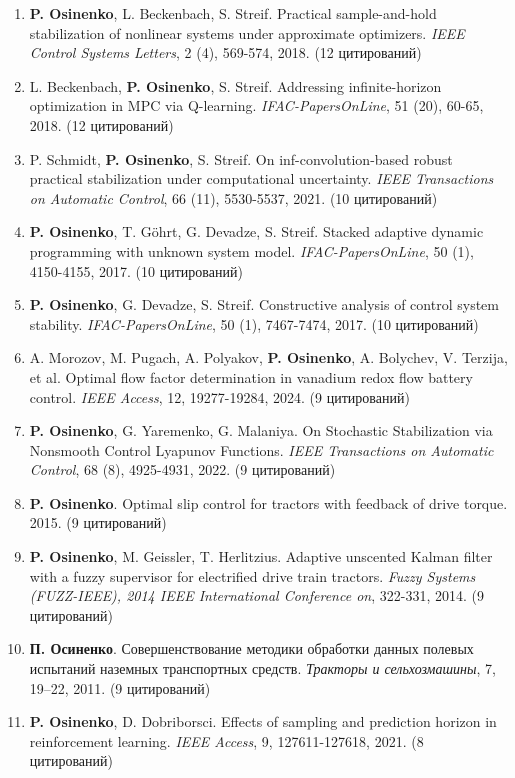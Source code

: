 \documentclass[12pt]{article}
\begin{document}
\begin{enumerate}[itemsep=5pt]
\item \textbf{P. Osinenko}, L. Beckenbach, S. Streif. Practical sample-and-hold stabilization of nonlinear systems under approximate optimizers. \textit{IEEE Control Systems Letters}, 2 (4), 569-574, 2018. (12 цитирований)

\item L. Beckenbach, \textbf{P. Osinenko}, S. Streif. Addressing infinite-horizon optimization in MPC via Q-learning. \textit{IFAC-PapersOnLine}, 51 (20), 60-65, 2018. (12 цитирований)

\item P. Schmidt, \textbf{P. Osinenko}, S. Streif. On inf-convolution-based robust practical stabilization under computational uncertainty. \textit{IEEE Transactions on Automatic Control}, 66 (11), 5530-5537, 2021. (10 цитирований)

\item \textbf{P. Osinenko}, T. Göhrt, G. Devadze, S. Streif. Stacked adaptive dynamic programming with unknown system model. \textit{IFAC-PapersOnLine}, 50 (1), 4150-4155, 2017. (10 цитирований)

\item \textbf{P. Osinenko}, G. Devadze, S. Streif. Constructive analysis of control system stability. \textit{IFAC-PapersOnLine}, 50 (1), 7467-7474, 2017. (10 цитирований)

\item A. Morozov, M. Pugach, A. Polyakov, \textbf{P. Osinenko}, A. Bolychev, V. Terzija, et al. Optimal flow factor determination in vanadium redox flow battery control. \textit{IEEE Access}, 12, 19277-19284, 2024. (9 цитирований)

\item \textbf{P. Osinenko}, G. Yaremenko, G. Malaniya. On Stochastic Stabilization via Nonsmooth Control Lyapunov Functions. \textit{IEEE Transactions on Automatic Control}, 68 (8), 4925-4931, 2022. (9 цитирований)

\item \textbf{P. Osinenko}. Optimal slip control for tractors with feedback of drive torque. 2015. (9 цитирований)

\item \textbf{P. Osinenko}, M. Geissler, T. Herlitzius. Adaptive unscented Kalman filter with a fuzzy supervisor for electrified drive train tractors. \textit{Fuzzy Systems (FUZZ-IEEE), 2014 IEEE International Conference on}, 322-331, 2014. (9 цитирований)

\item \textbf{П. Осиненко}. Совершенствование методики обработки данных полевых испытаний наземных транспортных средств. \textit{Тракторы и сельхозмашины}, 7, 19--22, 2011. (9 цитирований)

\item \textbf{P. Osinenko}, D. Dobriborsci. Effects of sampling and prediction horizon in reinforcement learning. \textit{IEEE Access}, 9, 127611-127618, 2021. (8 цитирований)

\end{enumerate}

\end{document}
